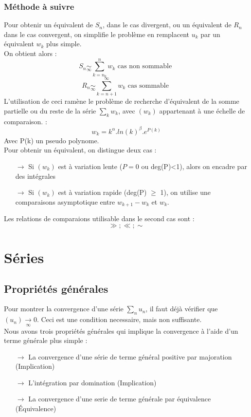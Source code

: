 \documentclass[a4paper,12 pt,oneside]{report}     %
\begin{document}
\subsection{Méthode à suivre}
Pour obtenir un équivalent de $S_n$, dans le cas divergent, ou un équivalent de $R_n$ dans le cas convergent, on simplifie le problème en remplacent $u_k$ par un équivalent $w_k$ plus simple.\\
On obtient alors : 
$$S_n \underset{\infty}\sim \sum_{k=n_0}^n w_k \mbox{ cas non sommable }$$
$$R_n \underset{\infty}\sim \sum_{k=n+1}^{\infty} w_k \mbox{ cas sommable }$$
L'utilisation de ceci ramène le problème de recherche d'équivalent de la somme partielle ou du reste de la série $\underset{k}\sum w_k$, avec $(w_k)$ appartenant à une échelle de comparaison. : 
$$w_k = k^{\alpha}.ln(k)^{\beta}.e^{P(k)}$$
Avec P(k) un pseudo polynome.\\
Pour obtenir un équivalent, on distingue deux cas : 
\begin{itemize}
 \item[$\rightarrow$] Si $(w_k)$ est à variation lente ($P = 0$ ou deg(P)<1), alors on encadre par des intégrales
 \item[$\rightarrow$] Si $(w_k)$ est à variation rapide (deg(P) $\geq$ 1), on utilise une comparaisons asymptotique entre $w_{k+1}-w_k$ et $w_k$.
\end{itemize}
Les relations de comparaions utilisable dans le second cas sont : 
$$\gg;\ll;\sim$$
\chapter{Séries}
\section{Propriétés générales}
Pour montrer la convergence d'une série $\underset{n} \sum u_n$, il faut déjà vérifier que $(u_n) \underset{\infty}\rightarrow 0$. Ceci est une condition necessaire, mais non suffisante.\\
Nous avons trois propriétés générales qui implique la convergence à l'aide d'un terme générale plus simple :
\begin{itemize}
 \item[$\rightarrow$] La convergence d'une série de terme général positive par majoration (Implication)
 \item[$\rightarrow$] L'intégration par domination (Implication)
 \item[$\rightarrow$] La convergence d'une serie de terme générale par équivalence (Équivalence)
\end{itemize}
\end{document}
